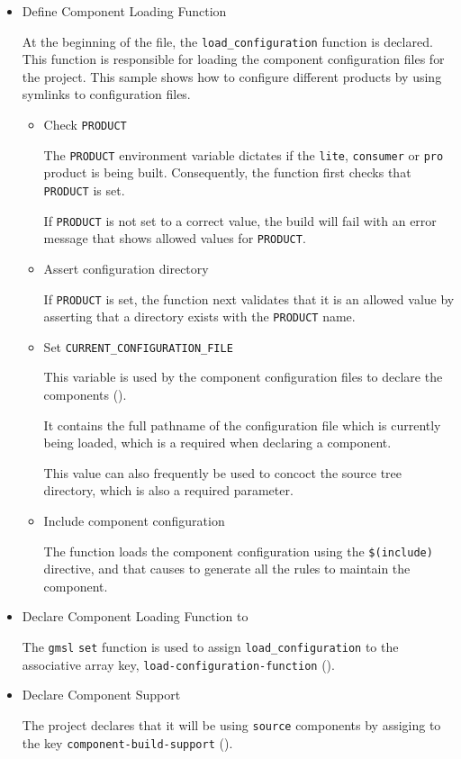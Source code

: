 \begin{itemize}
\item{Define Component Loading Function}

  At the beginning of the file, the \texttt{load\_configuration}
  function is declared.  This function is responsible for loading the
  component configuration files for the project.  This sample shows
  how to configure different products by using symlinks to
  configuration files.

  \begin{itemize}
  \item{Check \texttt{PRODUCT}}

    The \texttt{PRODUCT} environment variable dictates if the
    \texttt{lite}, \texttt{consumer} or \texttt{pro} product is being
    built.  Consequently, the function first checks that
    \texttt{PRODUCT} is set.

    If \texttt{PRODUCT} is not set to a correct value, the build will
    fail with an error message that shows allowed values for
    \texttt{PRODUCT}.

  \item{Assert configuration directory}

    If  \texttt{PRODUCT} is set, the function next validates that it
    is an allowed value by asserting that a directory exists with the
    \texttt{PRODUCT} name.

  \item{Set \texttt{CURRENT\_CONFIGURATION\_FILE}}

    This variable is used by the component configuration files to
    declare the components ().

    It contains the full pathname of the configuration file which is
    currently being loaded, which is a required when declaring a
    component.

    This value can also frequently be used to concoct the source tree
    directory, which is also a required parameter.

  \item{Include component configuration}

    The function loads the component configuration using the
    \texttt{\$(include)} directive, and that causes \lmsbw to generate
    all the rules to maintain the component.

  \end{itemize}

  \item{Declare Component Loading Function to \lmsbw}

    The \texttt{gmsl} \texttt{set} function is used to assign
    \texttt{load\_configuration} to the associative array key,
    \texttt{load-configuration-function}
    ().

  \item{Declare Component Support}

    The project declares that it will be using \texttt{source}
    components by assiging to the key \texttt{component-build-support}
    ().
\end{itemize}

